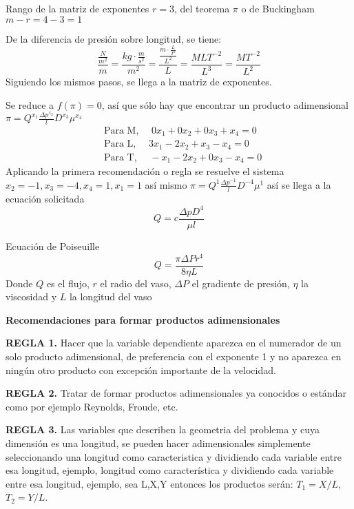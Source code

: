 Rango de la matriz de exponentes $r=3$, del teorema $\pi$ o de Buckingham $m-r=4-3=1$

De la diferencia de presión sobre longitud, se tiene:
\begin{equation*}
    \frac{\frac{N}{m^2}}{m} = \frac{kg\cdot \frac{m}{s^2}}{m^2} = \frac{\frac{m\cdot \frac{L}{T^2}}{L^2}}{L} = \frac{MLT^{ - 2}}{L^3} = \frac{MT^{ - 2}}{L^2}
\end{equation*}
Siguiendo los mismos pasos, se llega a la matriz de exponentes.

Se reduce a $f(\pi)=0$, así que sólo hay que encontrar un producto adimensional $\pi= Q^{x_1}\frac{\Delta p^{x_2}}{l}D^{x_3}\mu^{x_4}$
\begin{align*}
    &\text{Para M, }\quad 0x_1+ 0x_2+ 0x_3 + x_4 =0\\
    &\text{Para L, }\quad 3x_1 - 2x_2+ x_3 - x_4 = 0\\
    &\text{Para T, }\quad -x_1 - 2x_2 + 0x_3 - x_4 =0
\end{align*}
Aplicando la primera recomendación o regla se resuelve el sistema $x_2=-1,x_3=-4,x_4=1,x_1=1$ así mismo $\pi= Q^1\frac{\Delta p^{-1}}{l}D^{-4}\mu^1$ así se llega a la ecuación solicitada
\begin{equation*}
    Q = c\frac{\Delta pD^4}{\mu l}
\end{equation*}

Ecuación de Poiseuille
\begin{equation}
    Q = \frac{\pi \Delta Pr^4}{8\eta L}
\end{equation}
Donde $Q$ es el flujo, $r$ el radio del vaso, $\Delta P$ el gradiente de presión, $\eta$ la viscosidad y $L$ la longitud del vaso

\textbf{Recomendaciones para formar productos adimensionales}

\textbf{REGLA 1.} Hacer que la variable dependiente aparezca en el numerador de un solo producto adimensional, de preferencia con el exponente 1 y no aparezca en ningún otro producto con excepción importante de la velocidad.

\textbf{REGLA 2.} Tratar de formar productos adimensionales ya conocidos o estándar como por ejemplo Reynolds, Froude, etc.

\textbf{REGLA 3.} Las variables que describen la geometria del problema y cuya dimensión es una longitud, se pueden hacer adimensionales simplemente seleccionando una longitud como caracteristica y dividiendo cada variable entre esa longitud, ejemplo, longitud como característica y dividiendo cada variable entre esa longitud, ejemplo, sea L,X,Y entonces los productos serán: $T_1= X/L$, $T_2= Y/L$.

